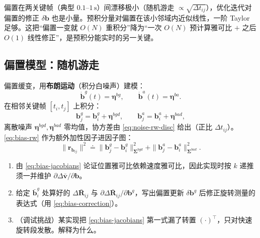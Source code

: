 \begin{insight}[一阶修正为什么够用]\label{ins:bias-firstorder}
偏置在两关键帧（典型 $0.1$--$1\,\mathrm s$）间漂移极小（随机游走 $\propto\sqrt{\Delta t_{ij}}$），优化迭代对偏置的修正 $\delta\mathbf b$ 也是小量。预积分量对偏置在该小邻域内近似线性，一阶 Taylor 足够。这把“偏置一变就 $O(N)$ 重积分”降为“一次 $O(N)$ 预计算雅可比 $+$ 之后 $O(1)$ 线性修正”，是预积分能实时的另一关键。
\end{insight}

\subsection{偏置模型：随机游走}
\label{subsec:bias-model}

偏置缓变，用\textbf{布朗运动}（积分白噪声）建模\cite{forster2017preintegration}：
\begin{equation}
  \dot{\mathbf b}^g(t)=\boldsymbol\eta^{bg},\qquad \dot{\mathbf b}^a(t)=\boldsymbol\eta^{ba}.
  \label{eq:bias-brownian}
\end{equation}
在相邻关键帧 $[t_i,t_j]$ 上积分：
\begin{equation}
  \mathbf b_j^g=\mathbf b_i^g+\boldsymbol\eta^{bgd},\qquad \mathbf b_j^a=\mathbf b_i^a+\boldsymbol\eta^{bad},
  \label{eq:bias-rw}
\end{equation}
离散噪声 $\boldsymbol\eta^{bgd},\boldsymbol\eta^{bad}$ 零均值，协方差由 \cref{eq:noise-rw-disc} 给出（正比 $\Delta t_{ij}$）。\cref{eq:bias-rw} 作为额外加性因子进因子图：
\begin{equation}
  \|\mathbf r_{\mathbf b_{ij}}\|^2\doteq\|\mathbf b_j^g-\mathbf b_i^g\|^2_{\boldsymbol\Sigma^{bgd}}+\|\mathbf b_j^a-\mathbf b_i^a\|^2_{\boldsymbol\Sigma^{bad}}.
  \label{eq:bias-factor}
\end{equation}

\begin{practice}
\begin{enumerate}
  \item 由 \cref{eq:bias-jacobians} 论证位置雅可比依赖速度雅可比，因此实现时按 $k$ 递推须一并维护 $\partial\Delta\bar{\mathbf v}/\partial\mathbf b$。
  \item 给定 $\bar{\mathbf b}_i^g$ 处算好的 $\Delta\bar{\mathbf R}_{ij}$ 与 $\partial\Delta\bar{\mathbf R}_{ij}/\partial\mathbf b^g$，写出偏置更新 $\delta\mathbf b^g$ 后修正旋转测量的表达式（用 \cref{eq:bias-correction}）。
  \item （调试挑战）某实现把 \cref{eq:bias-jacobians} 第一式漏了转置 $(\cdot)^\top$，只对快速旋转段发散。解释为什么。
\end{enumerate}
\end{practice}

